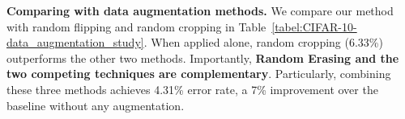 \documentclass[10pt,twocolumn,letterpaper]{article}
\begin{document}
\textbf{Comparing with data augmentation methods. }
We compare our method with random flipping and random cropping in Table~\ref{tabel:CIFAR-10-data_augmentation_study}. When applied alone, random cropping (6.33\%) outperforms the other two methods.
Importantly, \textbf{Random Erasing and the two competing techniques are complementary}. Particularly, combining these three methods achieves 4.31\% error rate,  a 7\% improvement over the baseline without any augmentation. %





\end{document}
